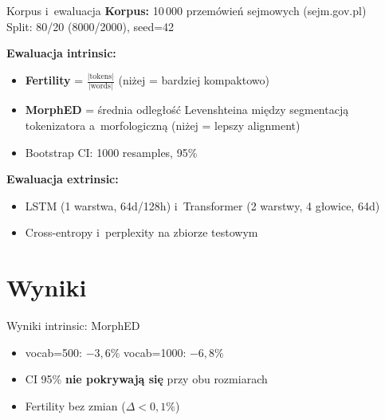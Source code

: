 \documentclass[aspectratio=169,11pt]{beamer}
\begin{document}
\begin{frame}{Korpus i~ewaluacja}
\textbf{Korpus:} 10\,000 przemówień sejmowych (sejm.gov.pl) \\
Split: 80/20 (8000/2000), seed=42

\bigskip

\textbf{Ewaluacja intrinsic:}
\begin{itemize}
  \item \textbf{Fertility} = $\frac{|\mathrm{tokens}|}{|\mathrm{words}|}$ (niżej = bardziej kompaktowo)
  \item \textbf{MorphED} = średnia odległość Levenshteina między segmentacją tokenizatora a~morfologiczną (niżej = lepszy alignment)
  \item Bootstrap CI: 1000 resamples, 95\%
\end{itemize}

\bigskip

\textbf{Ewaluacja extrinsic:}
\begin{itemize}
  \item LSTM (1 warstwa, 64d/128h) i~Transformer (2 warstwy, 4 głowice, 64d)
  \item Cross-entropy i~perplexity na zbiorze testowym
\end{itemize}
\end{frame}

\section{Wyniki}

\begin{frame}{Wyniki intrinsic: MorphED}
\begin{center}
\end{center}

\begin{itemize}
  \item vocab=500: $-3{,}6\%$ \quad vocab=1000: $-6{,}8\%$
  \item CI 95\% \textbf{nie pokrywają się} przy obu rozmiarach
  \item Fertility bez zmian ($\Delta < 0{,}1\%$)
\end{itemize}
\end{frame}
\end{document}
